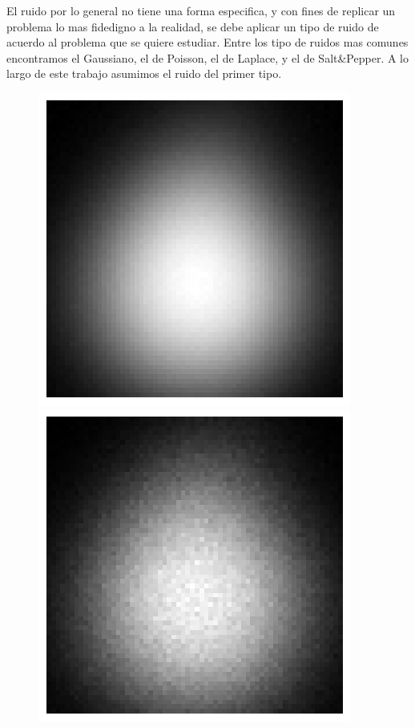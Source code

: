 \documentclass[12pt, oneside]{book}
\begin{document}
	El ruido por lo general no tiene una forma especifica, y con fines de replicar un problema lo mas fidedigno a la realidad, se debe aplicar un tipo de ruido de acuerdo al problema que se quiere estudiar. Entre los tipo de ruidos mas comunes encontramos el Gaussiano, el de Poisson, el de Laplace, y el de Salt\&Pepper. A lo largo de este trabajo asumimos el ruido del primer tipo. 
	
	\begin{figure}[H]
		\centering
		\includegraphics[scale=0.3]{Imagenes/mate_Gauss.png}
		\includegraphics[scale=0.3]{Imagenes/mate_Poisson.png}

\end{figure}
\end{document}
